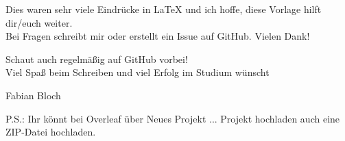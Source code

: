 Dies waren sehr viele Eindrücke in \LaTeX{} und ich hoffe, diese Vorlage hilft dir/euch weiter.\\

Bei Fragen schreibt mir oder erstellt ein Issue auf GitHub. Vielen Dank!

Schaut auch regelmäßig auf GitHub vorbei!\\

Viel Spaß beim Schreiben und viel Erfolg im Studium wünscht

Fabian Bloch

\vspace{7mm}
\textcolor{HCU}{P.S.: Ihr könnt bei Overleaf über \glqq Neues Projekt ... Projekt hochladen\grqq{} auch eine ZIP-Datei hochladen.}